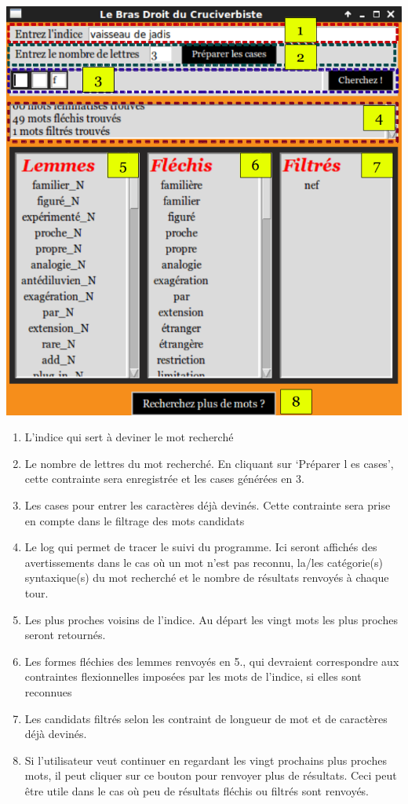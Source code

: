 \documentclass[a4paper, 12pt]{article}
\begin{document}
\begin{center}
\includegraphics{CrossWordInterface.png}
\end{center}

\begin{enumerate}
    \item{L'indice qui sert à deviner le mot recherché}
    \item{Le nombre de lettres du mot recherché. En cliquant sur \lq{Préparer l
    es cases}\rq, cette contrainte sera enregistrée et les cases générées en 3.}
    \item{Les cases pour entrer les caractères déjà devinés. Cette contrainte 
    sera prise en compte dans le filtrage des mots candidats}
    \item{Le log qui permet de tracer le suivi du programme. Ici seront 
    affichés des avertissements dans le cas où un mot n'est pas reconnu, la/les 
    catégorie(s) syntaxique(s) du mot recherché et le nombre de résultats 
    renvoyés à chaque tour.}
    \item{Les plus proches voisins de l'indice. Au départ les vingt mots les 
    plus proches seront retournés.}
    \item{Les formes fléchies des lemmes renvoyés en 5., qui devraient 
    correspondre aux contraintes flexionnelles imposées par les mots de 
    l'indice, si elles sont reconnues}
    \item{Les candidats filtrés selon les contraint de longueur de mot et de 
    caractères déjà devinés.}
    \item{Si l'utilisateur veut continuer en regardant les vingt prochains plus 
    proches mots, il peut cliquer sur ce bouton pour renvoyer plus de 
    résultats. Ceci peut être utile dans le cas où peu de résultats fléchis ou 
    filtrés sont renvoyés.}
    
\end{enumerate}
\end{document}
